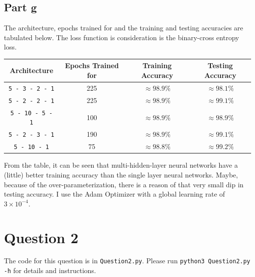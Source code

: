 \documentclass{article}
\begin{document}
\subsection*{Part g}
\begin{flushleft}
The architecture, epochs trained for and the training and testing accuracies are tabulated below. The loss function is consideration is the binary-cross entropy loss.
\begin{center}
\begin{tabular}{|c|c|c|c|}
\hline
Architecture & Epochs Trained for & Training Accuracy & Testing Accuracy \\
\hline
\hline
\texttt{5 - 3 - 2 - 1} & 225 & \(\approx 98.9\%\) & \(\approx 98.1\%\)\\
\hline
\texttt{5 - 2 - 2 - 1} & 225 & \(\approx 98.9\%\) & \(\approx 99.1\%\)\\
\hline
\texttt{5 - 10 - 5 - 1} & 100 & \(\approx 98.9\%\) & \(\approx 98.9\%\)\\
\hline
\texttt{5 - 2 - 3 - 1} & 190 & \(\approx 98.9\%\) & \(\approx 99.1\%\)\\
\hline
\texttt{5 - 10 - 1} & 75 & \(\approx 98.8\%\) & \(\approx 99.2\%\)\\
\hline
\end{tabular}
\end{center}

From the table, it can be seen that multi-hidden-layer neural networks have a (little) better training accuracy than the single layer neural networks. Maybe, because of the over-parameterization, there is a reason of that very small dip in testing accuracy. I use the Adam Optimizer with a global learning rate of \(3 \times 10^{-4}\).
\end{flushleft}

\section*{Question 2}
The code for this question is in \texttt{Question2.py}. Please run \texttt{python3 Question2.py -h} for details and instructions.
\end{document}
